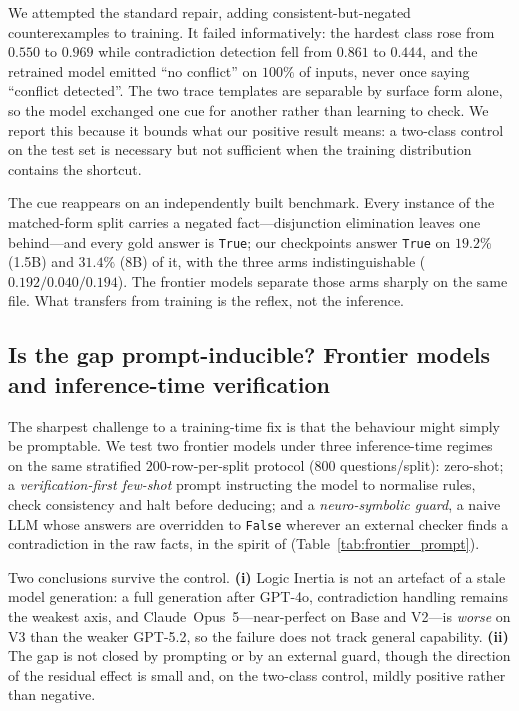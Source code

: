 \documentclass{article}
\begin{document}
We attempted the standard repair, adding consistent-but-negated counterexamples
to training. It failed informatively: the hardest class rose from $0.550$ to
$0.969$ while contradiction detection fell from $0.861$ to $0.444$, and the
retrained model emitted ``no conflict'' on $100\%$ of inputs, never once saying
``conflict detected''. The two trace templates are separable by surface form
alone, so the model exchanged one cue for another rather than learning to check.
We report this because it bounds what our positive result means: a two-class
control on the test set is necessary but not sufficient when the training
distribution contains the shortcut.

The cue reappears on an independently built benchmark. Every instance of the
matched-form split carries a negated fact---disjunction elimination leaves one
behind---and every gold answer is \texttt{True}; our checkpoints answer
\texttt{True} on $19.2\%$ (1.5B) and $31.4\%$ (8B) of it, with the three arms
indistinguishable ($0.192/0.040/0.194$). The frontier models separate those arms
sharply on the same file. What transfers from training is the reflex, not the
inference.

\subsection{Is the gap prompt-inducible? Frontier models and inference-time verification}
\label{sec:frontier_prompt}

The sharpest challenge to a training-time fix is that the behaviour might simply be promptable. We test two frontier models under three inference-time regimes on the same stratified $200$-row-per-split protocol ($800$ questions/split): zero-shot; a \emph{verification-first few-shot} prompt instructing the model to normalise rules, check consistency and halt before deducing; and a \emph{neuro-symbolic guard}, a naive LLM whose answers are overridden to \texttt{False} wherever an external checker finds a contradiction in the raw facts, in the spirit of \citet{vericot2026} (Table~\ref{tab:frontier_prompt}).

Two conclusions survive the control. \textbf{(i)} Logic Inertia is not an
artefact of a stale model generation: a full generation after GPT-4o,
contradiction handling remains the weakest axis, and Claude~Opus~5---near-perfect
on Base and V2---is \emph{worse} on V3 than the weaker GPT-5.2, so the failure
does not track general capability. \textbf{(ii)} The gap is not closed by
prompting or by an external guard, though the direction of the residual effect
is small and, on the two-class control, mildly positive rather than negative.
\end{document}
